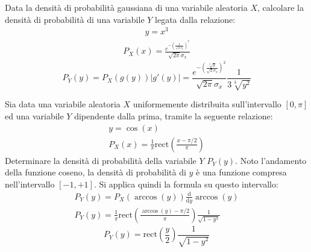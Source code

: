 \documentclass{article}
\newcommand{\rect}{\mbox{rect}}
\newcommand{\df}{\mathrm{d}}
\begin{document}
Data la densità di probabilità gaussiana di una variabile aleatoria $X$, calcolare la densità di probabilità di una variabile $Y$ legata dalla relazione:
\begin{gather*}
    y=x^3
\end{gather*}
\begin{gather*}
    P_X(x)=\displaystyle\frac{e^{-\left(\frac{x}{\sqrt{2}{\sigma_x}}\right)^2}}{\sqrt{2\pi}\sigma_x}
\end{gather*}
\begin{equation}
    P_Y(y)=P_X(g(y))|g'(y)|=\displaystyle\frac{e^{-\left(\frac{\sqrt[3]{y}}{\sqrt{2}{\sigma_x}}\right)^2}}{\sqrt{2\pi}\sigma_x}\frac{1}{3\sqrt[3]{y^2}}
\end{equation}



Sia data una variabile aleatoria $X$ uniformemente distribuita sull'intervallo $[0,\pi]$ ed una variabile $Y$ dipendente dalla prima, tramite la seguente relazione:
\begin{gather*}
    y=\cos(x)\\
    P_X(x)=\displaystyle\frac{1}{\pi}\rect\left(\frac{x-\pi/2}{\pi}\right)
\end{gather*}
Determinare la densità di probabilità della variabile $Y$ $P_Y(y)$. Noto l'andamento della funzione coseno, la densità di probabilità di $y$ è una funzione 
compresa nell'intervallo $[-1,+1]$. Si applica quindi la formula su questo intervallo:
\begin{gather*}
    P_Y(y)=P_X(\arccos(y))\displaystyle\frac{\df}{\df y}\arccos(y)\\
    P_Y(y)=\displaystyle\frac{1}{\pi}\rect\left(\frac{\arccos(y)-\pi/2}{\pi}\right)\frac{1}{\sqrt{1-y^2}}
\end{gather*}
\begin{equation}
    P_Y(y)=\displaystyle\rect\left(\frac{y}{2}\right)\frac{1}{\sqrt{1-y^2}}
\end{equation}
\end{document}
